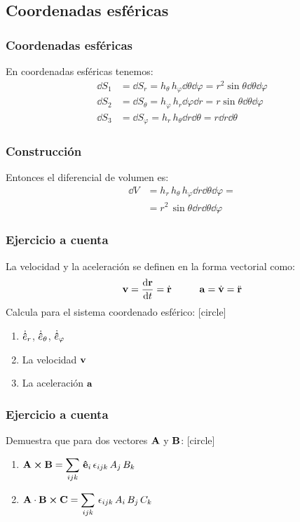 \documentclass[12pt]{beamer}
\begin{document}
\subsection*{Coordenadas esféricas}
\begin{frame}
\frametitle{Coordenadas esféricas}
En coordenadas esféricas tenemos:
\begin{align*}
\dd{S_{1}} &= \dd{S_{r}} = h_{\theta} \, h_{\varphi} \dd{\theta} \dd{\varphi} = r^{2} \sin \theta \dd{\theta} \dd{\varphi} \\[0.5em]
\dd{S_{2}} &= \dd{S_{\theta}} = h_{\varphi} \, h_{r} \dd{\varphi} \dd{r} = r \sin \theta \dd{\theta} \dd{\varphi} \\[0.5em]
\dd{S_{3}} &= \dd{S_{\varphi}} = h_{r} \, h_{\theta} \dd{r} \dd{\theta} = r \dd{r} \dd{\theta}
\end{align*}
\end{frame}
\begin{frame}
\frametitle{Construcción}
Entonces el diferencial de volumen es:
\begin{align*}
\dd{V} &= h_{r} \, h_{\theta} \, h_{\varphi} \dd{r} \dd{\theta} \dd{\varphi} = \\[0.5em]
&= r^{2} \, \sin \theta \dd{r} \dd{\theta} \dd{\varphi}
\end{align*}
\end{frame}
\begin{frame}
\frametitle{Ejercicio a cuenta}
La velocidad y la aceleración se definen en la forma vectorial como:
\begin{align*}
\vb{v} = \dv{\vb{r}}{t} = \dot{\vb{r}} \hspace{1cm} \vb{a} = \dot{\vb{v}} = \ddot{\vb{r}}
\end{align*}
Calcula para el sistema coordenado esférico:
[circle]
\begin{enumerate}
\item $\dot{\vu{e}}_{r}$, $\dot{\vu{e}}_{\theta}$, $\dot{\vu{e}}_{\varphi}$ 
\item La velocidad $\vb{v}$
\item La aceleración $\vb{a}$
\end{enumerate}
\end{frame}
\begin{frame}
\frametitle{Ejercicio a cuenta}
Demuestra que para dos vectores $\vb{A}$ y $\vb{B}$:
[circle]
\begin{enumerate}
\item $\vb{A} \cp \vb{B} = \displaystyle \sum_{ijk} \, \vu{e}_{i} \, \epsilon_{ijk} \, A_{j} \, B_{k}$ \\[1em]
\item $\vb{A} \cdot \vb{B} \cp \vb{C} = \displaystyle \sum_{ijk} \, \epsilon_{ijk} \, A_{i} \, B_{j} \, C_{k}$
\end{enumerate}
\end{frame}
\end{document}
